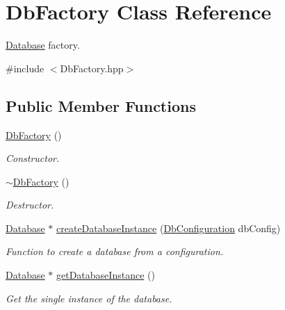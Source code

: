 \hypertarget{classDbFactory}{
\section{DbFactory Class Reference}
\label{classDbFactory}
}


\hyperlink{classDatabase}{Database} factory.  




{\ttfamily \#include $<$DbFactory.hpp$>$}

\subsection*{Public Member Functions}
\begin{DoxyCompactItemize}
\item 
\hypertarget{classDbFactory_ac47baec65bb6d6f591b2fb033bd7c193}{
\hyperlink{classDbFactory_ac47baec65bb6d6f591b2fb033bd7c193}{DbFactory} ()}
\label{classDbFactory_ac47baec65bb6d6f591b2fb033bd7c193}

\begin{DoxyCompactList}\small\item\em Constructor. \item\end{DoxyCompactList}\item 
\hypertarget{classDbFactory_a138084f15091e839a3952c4fe0ccd374}{
\hyperlink{classDbFactory_a138084f15091e839a3952c4fe0ccd374}{$\sim$DbFactory} ()}
\label{classDbFactory_a138084f15091e839a3952c4fe0ccd374}

\begin{DoxyCompactList}\small\item\em Destructor. \item\end{DoxyCompactList}\item 
\hyperlink{classDatabase}{Database} $\ast$ \hyperlink{classDbFactory_a89ba3d52c600515207220dc16f2a9563}{createDatabaseInstance} (\hyperlink{classDbConfiguration}{DbConfiguration} dbConfig)
\begin{DoxyCompactList}\small\item\em Function to create a database from a configuration. \item\end{DoxyCompactList}\item 
\hyperlink{classDatabase}{Database} $\ast$ \hyperlink{classDbFactory_aaf6d28cd7e9c189ed4574de3f9a49370}{getDatabaseInstance} ()
\begin{DoxyCompactList}\small\item\em Get the single instance of the database. \item\end{DoxyCompactList}\end{DoxyCompactItemize}
